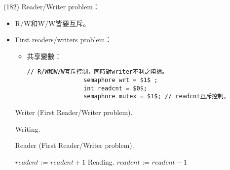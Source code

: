 \begin{theorem}{(182)} Reader/Writer problem：\begin{itemize}
        \item R/W和W/W皆要互斥。
        \item First readers/writers problem：\begin{itemize}
            \item 共享變數：\begin{lstlisting}[caption={Shared variables of First Reader/Writer problem.}, captionpos=b, mathescape=true]
                // R/W和W/W互斥控制，同時對writer不利之阻擋。
                semaphore wrt = $1$ ;
                int readcnt = $0$;
                semaphore mutex = $1$; // readcnt互斥控制。
            \end{lstlisting}
        \end{itemize}
        \begin{algorithm}[H]
            \caption{Writer (First Reader/Writer problem).}
            \begin{algorithmic}[1]
                    \Repeat
                        \State {}
                        \State Writing.
                        \State {}
                \EndFunction
            \end{algorithmic}
        \end{algorithm}
        \begin{algorithm}[H]
            \caption{Reader (First Reader/Writer problem).}
            \begin{algorithmic}[1]
                    \Repeat
                        \State {}
                        \State $readcnt$ := $readcnt + 1$
                         
                            \State {} 
                        \EndIf
                        \State {} 
                        \State Reading.
                        \State {}
                        \State $readcnt$ := $readcnt - 1$
                         
                            \State {} 
                        \EndIf
                        \State {}
                \EndFunction
            \end{algorithmic}

\end{algorithm}
\end{itemize}
\end{theorem}
